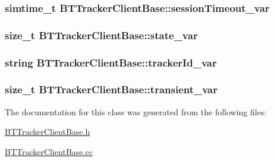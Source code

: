\subsubsection[{session\+Timeout\+\_\+var}]{\setlength{\rightskip}{0pt plus 5cm}simtime\+\_\+t B\+T\+Tracker\+Client\+Base\+::session\+Timeout\+\_\+var\hspace{0.3cm}{\ttfamily [protected]}}\label{classBTTrackerClientBase_ab3b0b46284315a9b2e71daf379b7a3ff}
\hypertarget{classBTTrackerClientBase_a0eead109fc2d0e3cd0462b1e19f87545}{}
\subsubsection[{state\+\_\+var}]{\setlength{\rightskip}{0pt plus 5cm}size\+\_\+t B\+T\+Tracker\+Client\+Base\+::state\+\_\+var\hspace{0.3cm}{\ttfamily [protected]}}\label{classBTTrackerClientBase_a0eead109fc2d0e3cd0462b1e19f87545}
\hypertarget{classBTTrackerClientBase_aee1b8d7f800c7642c1bdc435e968ec3b}{}
\subsubsection[{tracker\+Id\+\_\+var}]{\setlength{\rightskip}{0pt plus 5cm}string B\+T\+Tracker\+Client\+Base\+::tracker\+Id\+\_\+var\hspace{0.3cm}{\ttfamily [protected]}}\label{classBTTrackerClientBase_aee1b8d7f800c7642c1bdc435e968ec3b}
\hypertarget{classBTTrackerClientBase_a1d356eceda84b31bef362f262c664a71}{}
\subsubsection[{transient\+\_\+var}]{\setlength{\rightskip}{0pt plus 5cm}size\+\_\+t B\+T\+Tracker\+Client\+Base\+::transient\+\_\+var\hspace{0.3cm}{\ttfamily [protected]}}\label{classBTTrackerClientBase_a1d356eceda84b31bef362f262c664a71}


The documentation for this class was generated from the following files\+:\begin{DoxyCompactItemize}
\item 
\hyperlink{BTTrackerClientBase_8h}{B\+T\+Tracker\+Client\+Base.\+h}\item 
\hyperlink{BTTrackerClientBase_8cc}{B\+T\+Tracker\+Client\+Base.\+cc}\end{DoxyCompactItemize}
